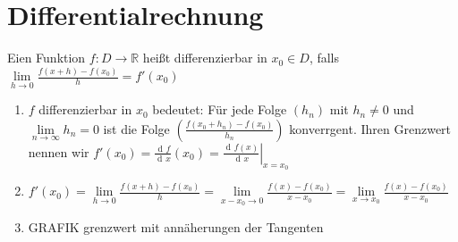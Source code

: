 \documentclass[a4paper,titlepage,oneside]{article}
\def\R{\ensuremath{\mathbb{R}} }
\newcommand{\der}{\operatorname{d\!}{}}
\renewcommand{\liminf}[2][n]{\ensuremath{\lim\limits_{#1 \rightarrow \infty}{#2}}}
\newcommand{\limnull}[2][n]{\ensuremath{\lim\limits_{#1 \rightarrow 0}{#2}}}
\newcommand{\limAB}[3][x]{\ensuremath{\lim\limits_{#1 \rightarrow #2}{#3}}}
\newcommand{\limA}[2][x_0]{\limAB{#1}{#2}}
\theoremstyle{thmstyle}
\begin{document}
\newpage
\section{Differentialrechnung} 

\begin{defi}
Eien Funktion $f : D \to \R$ heißt differenzierbar in $x_0 \in D$, falls $\limnull[h]{\frac{f(x + h) - f(x_0)}{h}} = f'(x_0)$
\end{defi}

\begin{bem}
\begin{enumerate}
\item $f$ differenzierbar in $x_0$ bedeutet:  Für jede Folge $(h_n)$ mit $h_n \ne 0$ und $\liminf{h_n} = 0$ ist die Folge $\left(\frac{f(x_0 + h_n) - f(x_0)}{h_n}\right)$ konverrgent. Ihren Grenzwert nennen wir $f'(x_0) = \frac{\der f}{\der x}(x_0) = \left.\frac{\der f(x)}{\der x}\right|_{x = x_0}$
\item $f'(x_0) = \limnull[h]{\frac{f(x + h) - f(x_0)}{h}} = \limnull[x-x_0]{\frac{f(x) - f(x_0)}{x-x_0}} = \limA{\frac{f(x) - f(x_0)}{x-x_0}}$
\item GRAFIK grenzwert mit annäherungen der Tangenten
\end{enumerate}
\end{bem}
\end{document}
